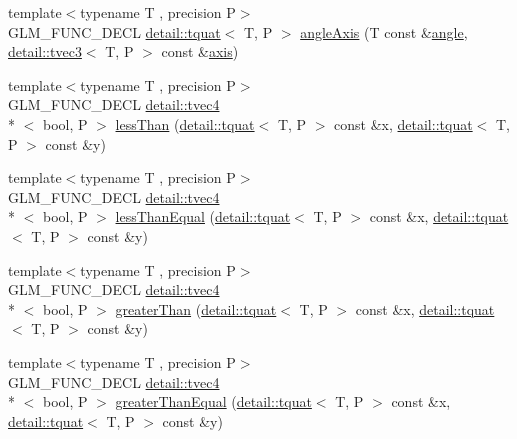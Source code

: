 \begin{DoxyCompactItemize}
\item 
{\footnotesize template$<$typename T , precision P$>$ }\\G\-L\-M\-\_\-\-F\-U\-N\-C\-\_\-\-D\-E\-C\-L \hyperlink{structglm_1_1detail_1_1tquat}{detail\-::tquat}$<$ T, P $>$ \hyperlink{group__gtc__quaternion_ga771b3e16cca8324e7111b923476be666}{angle\-Axis} (T const \&\hyperlink{group__gtc__quaternion_ga23a3fc7ada5bbb665ff84c92c6e0542c}{angle}, \hyperlink{structglm_1_1detail_1_1tvec3}{detail\-::tvec3}$<$ T, P $>$ const \&\hyperlink{group__gtc__quaternion_ga8eef9f8c3f2e4836dccf09df975b20fb}{axis})
\item 
{\footnotesize template$<$typename T , precision P$>$ }\\G\-L\-M\-\_\-\-F\-U\-N\-C\-\_\-\-D\-E\-C\-L \hyperlink{structglm_1_1detail_1_1tvec4}{detail\-::tvec4}\\*
$<$ bool, P $>$ \hyperlink{group__gtc__quaternion_ga4e4c37b86cecde7e1076c5b5fdb920b9}{less\-Than} (\hyperlink{structglm_1_1detail_1_1tquat}{detail\-::tquat}$<$ T, P $>$ const \&x, \hyperlink{structglm_1_1detail_1_1tquat}{detail\-::tquat}$<$ T, P $>$ const \&y)
\item 
{\footnotesize template$<$typename T , precision P$>$ }\\G\-L\-M\-\_\-\-F\-U\-N\-C\-\_\-\-D\-E\-C\-L \hyperlink{structglm_1_1detail_1_1tvec4}{detail\-::tvec4}\\*
$<$ bool, P $>$ \hyperlink{group__gtc__quaternion_ga313fe20896a8cd43c6d08cc88fa18faa}{less\-Than\-Equal} (\hyperlink{structglm_1_1detail_1_1tquat}{detail\-::tquat}$<$ T, P $>$ const \&x, \hyperlink{structglm_1_1detail_1_1tquat}{detail\-::tquat}$<$ T, P $>$ const \&y)
\item 
{\footnotesize template$<$typename T , precision P$>$ }\\G\-L\-M\-\_\-\-F\-U\-N\-C\-\_\-\-D\-E\-C\-L \hyperlink{structglm_1_1detail_1_1tvec4}{detail\-::tvec4}\\*
$<$ bool, P $>$ \hyperlink{group__gtc__quaternion_ga63be67bccef0b0ad4e60656223ab3761}{greater\-Than} (\hyperlink{structglm_1_1detail_1_1tquat}{detail\-::tquat}$<$ T, P $>$ const \&x, \hyperlink{structglm_1_1detail_1_1tquat}{detail\-::tquat}$<$ T, P $>$ const \&y)
\item 
{\footnotesize template$<$typename T , precision P$>$ }\\G\-L\-M\-\_\-\-F\-U\-N\-C\-\_\-\-D\-E\-C\-L \hyperlink{structglm_1_1detail_1_1tvec4}{detail\-::tvec4}\\*
$<$ bool, P $>$ \hyperlink{group__gtc__quaternion_gac90d5af34a03cd665a349ac30e4cc44c}{greater\-Than\-Equal} (\hyperlink{structglm_1_1detail_1_1tquat}{detail\-::tquat}$<$ T, P $>$ const \&x, \hyperlink{structglm_1_1detail_1_1tquat}{detail\-::tquat}$<$ T, P $>$ const \&y)

\end{DoxyCompactItemize}
